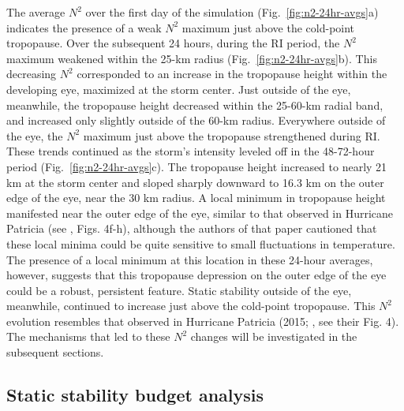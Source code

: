 \documentclass{ametsoc}
\begin{document}
The average $N^2$ over the first day of the simulation (Fig.~\ref{fig:n2-24hr-avgs}a) indicates the presence of a weak $N^2$ maximum just above the cold-point tropopause.
Over the subsequent 24 hours, during the RI period, the $N^2$ maximum weakened within the 25-km radius (Fig.~\ref{fig:n2-24hr-avgs}b).
This decreasing $N^2$ corresponded to an increase in the tropopause height within the developing eye, maximized at the storm center.
Just outside of the eye, meanwhile, the tropopause height decreased within the 25-60-km radial band, and increased only slightly outside of the 60-km radius.
Everywhere outside of the eye, the $N^2$ maximum just above the tropopause strengthened during RI.
These trends continued as the storm's intensity leveled off in the 48-72-hour period (Fig.~\ref{fig:n2-24hr-avgs}c).
The tropopause height increased to nearly 21 km at the storm center and sloped sharply downward to 16.3 km on the outer edge of the eye, near the 30 km radius.
A local minimum in tropopause height manifested near the outer edge of the eye, similar to that observed in Hurricane Patricia (see \citeauthor{DuranMolinari2018} \citeyear{DuranMolinari2018}, Figs. 4f-h), although the authors of that paper cautioned that these local minima could be quite sensitive to small fluctuations in temperature.
The presence of a local minimum at this location in these 24-hour averages, however, suggests that this tropopause depression on the outer edge of the eye could be a robust, persistent feature.
Static stability outside of the eye, meanwhile, continued to increase just above the cold-point tropopause.
This $N^2$ evolution resembles that observed in Hurricane Patricia (2015; \citeauthor{DuranMolinari2018} \citeyear{DuranMolinari2018}, see their Fig. 4).
The mechanisms that led to these $N^2$ changes will be investigated in the subsequent sections.

 \subsection{Static stability budget analysis}
\end{document}
